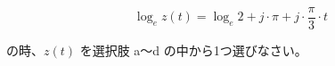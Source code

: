 \[
\log_e z(t) = \log_e 2 + j \cdot \pi + j \cdot \frac{\pi}{3} \cdot t
\]

\bigskip
\noindent の時、$z(t)$ を選択肢 a〜d の中から1つ選びなさい。
